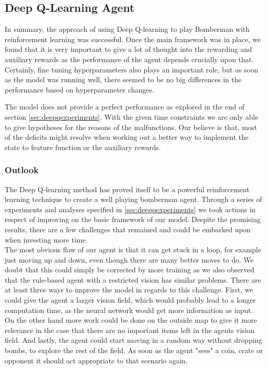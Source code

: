 
\subsection{Deep Q-Learning Agent}

In summary, the approach of using Deep Q-learning to play Bomberman with reinforcement learning was successful. Once the main framework was in place, we found that it is very important to give a lot of thought into the rewarding and auxiliary rewards as the performance of the agent depends crucially upon that. Certainly, fine tuning hyperparameters also plays an important role, but as soon as the model was running well, there seemed to be no big differences in the performance based on hyperparameter changes.

The model does not provide a perfect performance as explored in the end of section \ref{sec:deepqexperiments}. With the given time constraints we are only able to give hypotheses for the reasons of the malfunctions. Our believe is that, most of the deficits might resolve when working out a better way to implement the state to feature function or the auxiliary rewards.

\subsubsection{Outlook}

The Deep Q-learning method has proved itself to be a powerful reinforcement learning technique to create a well playing bomberman agent. Through a series of experiments and analyses specified in \ref{sec:deepqexperiments} we took actions in respect of improving on the basic framework of our model. Despite the promising results, there are a few challenges that remained and could be embarked upon when investing more time. \\

The most obvious flaw of our agent is that it can get stuck in a loop, for example just moving up and down, even though there are many better moves to do. We doubt that this could simply be corrected by more training as we also observed that the rule-based agent with a restricted vision has similar problems. There are at least three ways to improve the model in regards to this challenge. First, we could give the agent a larger vision field, which would probably lead to a longer computation time, as the neural network would get more information as input. On the other hand more work could be done on the outside map to give it more relevance in the case that there are no important items left in the agents vision field. And lastly, the agent could start moving in a random way without dropping bombs, to explore the rest of the field. As soon as the agent "sees" a coin, crate or opponent it should act appropriate to that scenario again.

